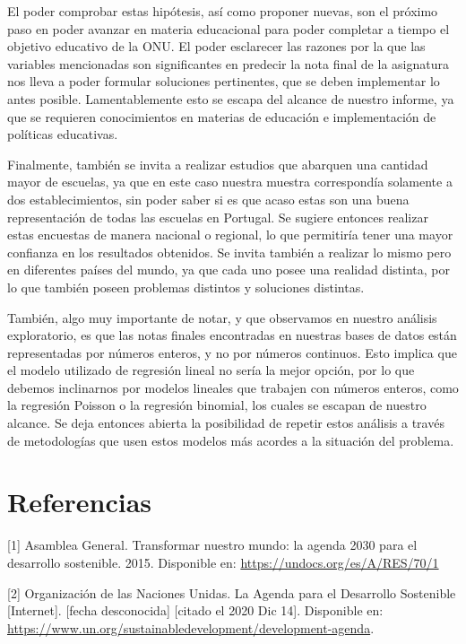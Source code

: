 \documentclass[
]{article}
\begin{document}
El poder comprobar estas hipótesis, así como proponer nuevas, son el
próximo paso en poder avanzar en materia educacional para poder
completar a tiempo el objetivo educativo de la ONU. El poder esclarecer
las razones por la que las variables mencionadas son significantes en
predecir la nota final de la asignatura nos lleva a poder formular
soluciones pertinentes, que se deben implementar lo antes posible.
Lamentablemente esto se escapa del alcance de nuestro informe, ya que se
requieren conocimientos en materias de educación e implementación de
políticas educativas.

Finalmente, también se invita a realizar estudios que abarquen una
cantidad mayor de escuelas, ya que en este caso nuestra muestra
correspondía solamente a dos establecimientos, sin poder saber si es que
acaso estas son una buena representación de todas las escuelas en
Portugal. Se sugiere entonces realizar estas encuestas de manera
nacional o regional, lo que permitiría tener una mayor confianza en los
resultados obtenidos. Se invita también a realizar lo mismo pero en
diferentes países del mundo, ya que cada uno posee una realidad
distinta, por lo que también poseen problemas distintos y soluciones
distintas.

También, algo muy importante de notar, y que observamos en nuestro
análisis exploratorio, es que las notas finales encontradas en nuestras
bases de datos están representadas por números enteros, y no por números
continuos. Esto implica que el modelo utilizado de regresión lineal no
sería la mejor opción, por lo que debemos inclinarnos por modelos
lineales que trabajen con números enteros, como la regresión Poisson o
la regresión binomial, los cuales se escapan de nuestro alcance. Se deja
entonces abierta la posibilidad de repetir estos análisis a través de
metodologías que usen estos modelos más acordes a la situación del
problema.

\newpage

\hypertarget{referencias}{%
\section{Referencias}\label{referencias}}

{[}1{]} Asamblea General. Transformar nuestro mundo: la agenda 2030 para
el desarrollo sostenible. 2015. Disponible en:
\url{https://undocs.org/es/A/RES/70/1}

{[}2{]} Organización de las Naciones Unidas. La Agenda para el
Desarrollo Sostenible {[}Internet{]}. {[}fecha desconocida{]} {[}citado
el 2020 Dic 14{]}. Disponible en:
\url{https://www.un.org/sustainabledevelopment/development-agenda}.
\end{document}

